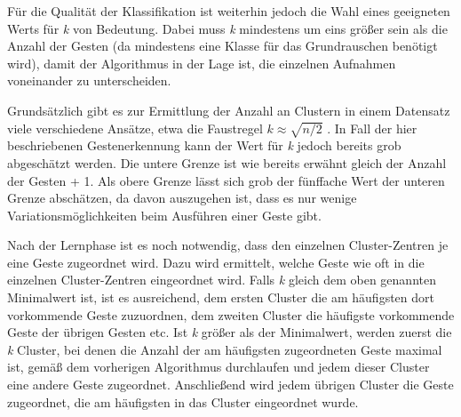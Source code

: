 Für die Qualität der Klassifikation ist weiterhin jedoch die Wahl eines geeigneten Werts für \emph{k} von Bedeutung. Dabei muss \emph{k} mindestens um eins größer sein als die Anzahl der Gesten (da mindestens eine Klasse für das Grundrauschen benötigt wird),
damit der Algorithmus in der Lage ist, die einzelnen Aufnahmen voneinander zu unterscheiden.  


Grundsätzlich gibt es zur Ermittlung der Anzahl an Clustern in einem Datensatz viele verschiedene Ansätze, etwa die Faustregel $k \approx \sqrt{n/2}$ \cite{WikipediaKMeansKValue}. In Fall der hier beschriebenen Gestenerkennung kann der Wert für \emph{k} jedoch bereits grob abgeschätzt werden. Die untere Grenze ist wie bereits erwähnt gleich der Anzahl der Gesten + 1. Als obere Grenze lässt sich grob der fünffache Wert der unteren Grenze abschätzen, da davon auszugehen ist, dass es nur wenige Variationsmöglichkeiten beim Ausführen einer Geste gibt.

Nach der Lernphase ist es noch notwendig, dass den einzelnen Cluster-Zentren je eine Geste zugeordnet wird. Dazu wird ermittelt, welche Geste wie oft in die einzelnen Cluster-Zentren eingeordnet wird. Falls \emph{k} gleich dem oben genannten Minimalwert ist, ist es ausreichend, dem ersten Cluster die am häufigsten dort vorkommende Geste zuzuordnen, dem zweiten Cluster die häufigste vorkommende Geste der übrigen Gesten etc. 
Ist \emph{k} größer als der Minimalwert, werden zuerst die \emph{k} Cluster, bei denen die Anzahl der am häufigsten zugeordneten Geste maximal ist, gemäß dem vorherigen Algorithmus durchlaufen und jedem dieser Cluster eine andere Geste zugeordnet. Anschließend wird jedem übrigen Cluster die Geste zugeordnet, die am häufigsten in das Cluster eingeordnet wurde.


